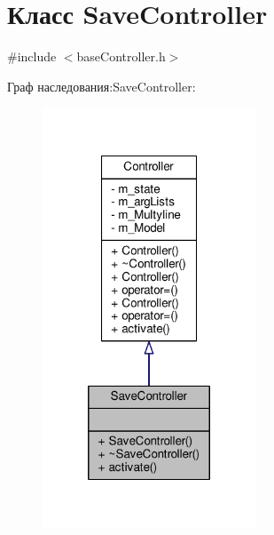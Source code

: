 \hypertarget{class_save_controller}{\section{Класс Save\-Controller}
\label{class_save_controller}
}


{\ttfamily \#include $<$base\-Controller.\-h$>$}



Граф наследования\-:Save\-Controller\-:
\nopagebreak
\begin{figure}[H]
\begin{center}
\leavevmode
\includegraphics[width=180pt]{class_save_controller__inherit__graph}
\end{center}
\end{figure}



